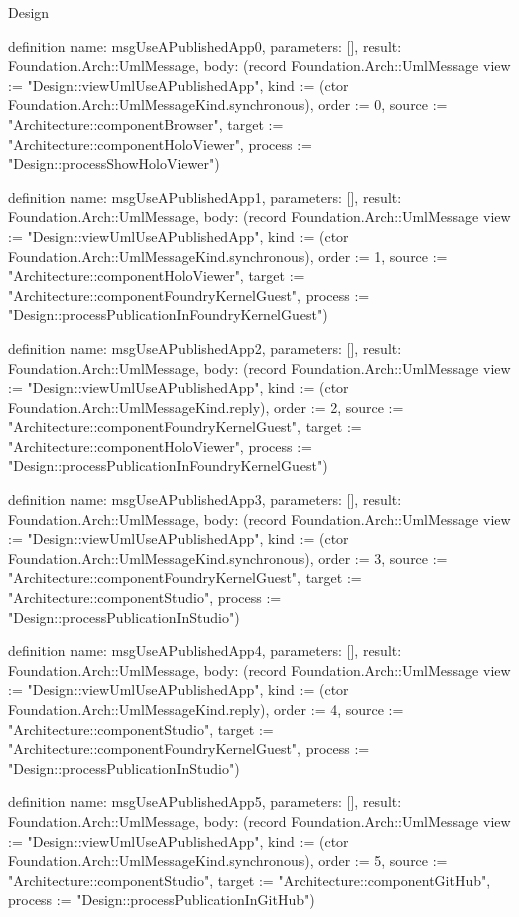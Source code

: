 \begin{lexlean}{Design}
\begin{semanticmodule}
definition{
  name: msgUseAPublishedApp0,
  parameters: [],
  result: Foundation.Arch::UmlMessage,
  body: (record Foundation.Arch::UmlMessage {view := "Design::viewUmlUseAPublishedApp", kind := (ctor Foundation.Arch::UmlMessageKind.synchronous), order := 0, source := "Architecture::componentBrowser", target := "Architecture::componentHoloViewer", process := "Design::processShowHoloViewer"})
}

definition{
  name: msgUseAPublishedApp1,
  parameters: [],
  result: Foundation.Arch::UmlMessage,
  body: (record Foundation.Arch::UmlMessage {view := "Design::viewUmlUseAPublishedApp", kind := (ctor Foundation.Arch::UmlMessageKind.synchronous), order := 1, source := "Architecture::componentHoloViewer", target := "Architecture::componentFoundryKernelGuest", process := "Design::processPublicationInFoundryKernelGuest"})
}

definition{
  name: msgUseAPublishedApp2,
  parameters: [],
  result: Foundation.Arch::UmlMessage,
  body: (record Foundation.Arch::UmlMessage {view := "Design::viewUmlUseAPublishedApp", kind := (ctor Foundation.Arch::UmlMessageKind.reply), order := 2, source := "Architecture::componentFoundryKernelGuest", target := "Architecture::componentHoloViewer", process := "Design::processPublicationInFoundryKernelGuest"})
}

definition{
  name: msgUseAPublishedApp3,
  parameters: [],
  result: Foundation.Arch::UmlMessage,
  body: (record Foundation.Arch::UmlMessage {view := "Design::viewUmlUseAPublishedApp", kind := (ctor Foundation.Arch::UmlMessageKind.synchronous), order := 3, source := "Architecture::componentFoundryKernelGuest", target := "Architecture::componentStudio", process := "Design::processPublicationInStudio"})
}

definition{
  name: msgUseAPublishedApp4,
  parameters: [],
  result: Foundation.Arch::UmlMessage,
  body: (record Foundation.Arch::UmlMessage {view := "Design::viewUmlUseAPublishedApp", kind := (ctor Foundation.Arch::UmlMessageKind.reply), order := 4, source := "Architecture::componentStudio", target := "Architecture::componentFoundryKernelGuest", process := "Design::processPublicationInStudio"})
}

definition{
  name: msgUseAPublishedApp5,
  parameters: [],
  result: Foundation.Arch::UmlMessage,
  body: (record Foundation.Arch::UmlMessage {view := "Design::viewUmlUseAPublishedApp", kind := (ctor Foundation.Arch::UmlMessageKind.synchronous), order := 5, source := "Architecture::componentStudio", target := "Architecture::componentGitHub", process := "Design::processPublicationInGitHub"})
}


\end{semanticmodule}
\end{lexlean}
